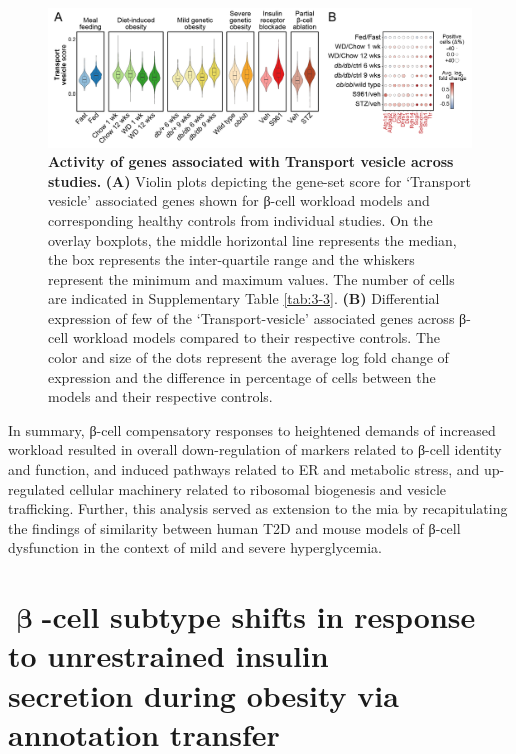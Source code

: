 \begin{figure}[H]
\centering
\includegraphics[width=\linewidth]{Chapter5/Fig/F3-13-05.png}
\caption[Scoring of gene-set - \textit{Transport Vesicle}]{\textbf{Activity of genes associated with Transport vesicle across studies.} \textbf{(A)} Violin plots depicting the gene-set score for `Transport vesicle' associated genes shown for β-cell workload models and corresponding healthy controls from individual studies. On the overlay boxplots, the middle horizontal line represents the median, the box represents the inter-quartile range and the whiskers represent the minimum and maximum values. The number of cells are indicated in Supplementary Table \ref{tab:3-3}. \textbf{(B)} Differential expression of few of the `Transport-vesicle' associated genes across β-cell workload models compared to their respective controls. The color and size of the dots represent the average log fold change of expression and the difference in percentage of cells between the models and their respective controls.}
\label{fig:chp3_gs_tv}
\end{figure}


In summary, β-cell compensatory responses to heightened demands of increased workload resulted in overall down-regulation of markers related to β-cell identity and function, and induced pathways related to ER and metabolic stress,  and up-regulated cellular machinery related to ribosomal biogenesis and  vesicle trafficking. Further, this analysis served as extension to the \gls{mia} by recapitulating the findings of similarity between human T2D and mouse models of β-cell dysfunction in the context of mild and severe hyperglycemia. %

\clearpage

\section{ \( \mathbf{\upbeta} \)-cell subtype shifts in response to unrestrained insulin\\secretion during obesity via annotation transfer}
\label{sec:chp3_validation}

